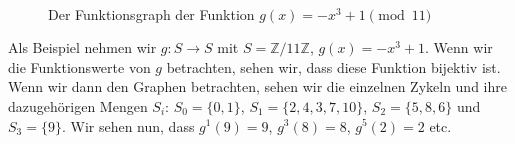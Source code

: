 \paragraph{}
\begin{wrapfigure}{l}{0.5\textwidth}

\caption{\small Der Funktionsgraph der Funktion $g(x) = -x^3 + 1 \pmod{11}$}
\end{wrapfigure}

Als Beispiel nehmen wir $g : S \rightarrow S$ mit $S = \mathbb{Z}/11\mathbb{Z}$, $g(x) = -x^3 + 1$. Wenn wir die Funktionswerte von $g$ betrachten, sehen wir, dass diese Funktion bijektiv ist. Wenn wir dann den Graphen betrachten, sehen wir die einzelnen Zykeln und ihre dazugehörigen Mengen $S_i$: $S_0 = \{0, 1\}$, $S_1 = \{2, 4, 3, 7, 10\}$, $S_2 = \{5, 8, 6\}$ und $S_3 = \{9\}$. Wir sehen nun, dass $g^1(9) = 9$, $g^3(8) = 8$, $g^5(2) = 2$ etc. 

\paragraph{}

